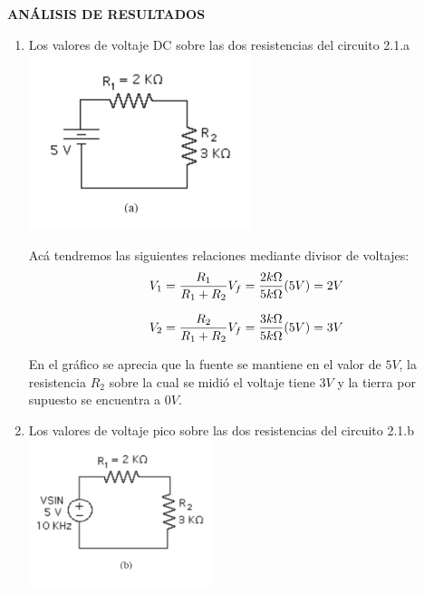 \documentclass[12pt]{article}
\begin{document}
	\newpage
	
	\begin{center}
		\textbf{\large ANÁLISIS DE RESULTADOS}\\
	\end{center}
	
	\renewcommand{\theenumi}{\alph{enumi}} %
	
	\begin{enumerate}
		\item Los valores de voltaje DC sobre las dos resistencias del circuito 2.1.a\\
		
		\includegraphics{Img/2_1_a}
		
		\noindent Acá tendremos las siguientes relaciones mediante divisor de voltajes:\\
		
		\begin{equation}
			\notag V_1 = \frac{R_1}{R_1 + R_2} V_f = \frac{2k\Omega}{5k\Omega}(5V) = 2V
		\end{equation}
	
		\begin{equation}
			\notag V_2 = \frac{R_2}{R_1 + R_2} V_f = \frac{3k\Omega}{5k\Omega}(5V) = 3V
		\end{equation}
	
		\noindent En el gráfico se aprecia que la fuente se mantiene en el valor de $5V$, la resistencia $R_2$ sobre la cual se midió el voltaje tiene $3V$ y la tierra por supuesto se encuentra a $0V$.
		
		\item Los valores de voltaje pico sobre las dos resistencias del circuito 2.1.b\\
		
		\includegraphics{Img/2_1_b}
		

\end{enumerate}
\end{document}
